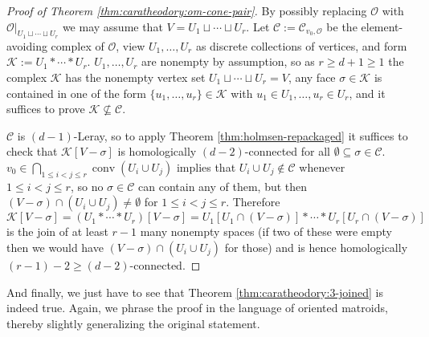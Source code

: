 \documentclass[a4paper,11pt,reqno, english]{amsart}
\theoremstyle{definition}
\theoremstyle{remark}
\DeclareMathOperator{\conv}{\mathrm{conv}}
\begin{document}
\begin{proof}[Proof of Theorem \ref{thm:caratheodory:om-cone-pair}]
    By possibly replacing $\mathscr{O}$ with $\mathscr{O}|_{U_1\sqcup\cdots\sqcup U_r}$ we may assume that $V=U_1\sqcup\cdots\sqcup U_r$. Let $\mathscr{C}:=\mathscr{C}_{v_0,\mathscr{O}}$ be the element-avoiding complex of $\mathscr{O}$, view $U_1,\ldots,U_r$ as discrete collections of vertices, and form $\mathscr{K}:=U_1*\cdots*U_r$. $U_1,\ldots,U_r$ are nonempty by assumption, so as $r\geq d+1\geq 1$ the complex $\mathscr{K}$ has the nonempty vertex set $U_1\sqcup\cdots\sqcup U_r=V$, any face $\sigma\in\mathscr{K}$ is contained in one of the form $\{u_1,\ldots,u_r\}\in\mathscr{K}$ with $u_1\in U_1,\ldots,u_r\in U_r$, and it suffices to prove $\mathscr{K}\nsubseteq\mathscr{C}$.

    $\mathscr{C}$ is $(d-1)$-Leray, so to apply Theorem \ref{thm:holmsen-repackaged} it suffices to check that $\mathscr{K}[V-\sigma]$ is homologically $(d-2)$-connected for all $\emptyset\subseteq\sigma\in\mathscr{C}$. $v_0\in\bigcap_{1\leq i<j\leq r}\conv(U_i\cup U_j)$ implies that $U_i\cup U_j\notin\mathscr{C}$ whenever $1\leq i<j\leq r$, so no $\sigma\in\mathscr{C}$ can contain any of them, but then $(V-\sigma)\cap(U_i\cup U_j)\neq\emptyset$ for $1\leq i<j\leq r$. Therefore 
    \[
    \mathscr{K}[V-\sigma]=(U_1*\cdots*U_r)[V-\sigma]=U_1[U_1\cap(V-\sigma)]*\cdots*U_r[U_r\cap(V-\sigma)]
    \] is the join of at least $r-1$ many nonempty spaces (if two of these were empty then we would have $(V-\sigma)\cap(U_i\cup U_j)$ for those) and is hence homologically $(r-1)-2\geq (d-2)$-connected.
\end{proof}
And finally, we just have to see that Theorem \ref{thm:caratheodory:3-joined} is indeed true. Again, we phrase the proof in the language of oriented matroids, thereby slightly generalizing the original statement.
\end{document}
